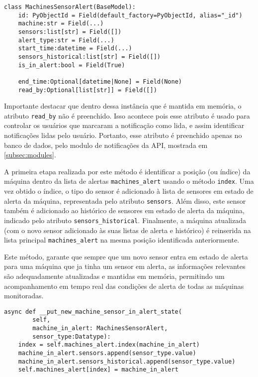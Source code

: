 \begin{verbatim}
class MachinesSensorAlert(BaseModel):
    id: PyObjectId = Field(default_factory=PyObjectId, alias="_id")
    machine:str = Field(...)
    sensors:list[str] = Field([])
    alert_type:str = Field(...)
    start_time:datetime = Field(...)
    sensors_historical:list[str] = Field([])
    is_in_alert:bool = Field(True)
    
    end_time:Optional[datetime|None] = Field(None)
    read_by:Optional[list[str]] = Field([])
\end{verbatim}

Importante destacar que dentro dessa instância que é mantida em memória, o atributo \texttt{read\_by} não é preenchido. Isso acontece pois esse atributo é usado para controlar os usuários que marcaram a notificação como lida, e assim identificar notificações lidas pelo usuário. Portanto, esse atributo é preenchido apenas no banco de dados, pelo modulo de notificações da \gls{API}, mostrada em \ref{subsec:modules}.

A primeira etapa realizada por este método é identificar a posição (ou índice) da máquina dentro da lista de alertas \texttt{machines\_alert} usando o método \texttt{index}. Uma vez obtido o índice, o tipo do sensor é adicionado à lista de sensores em estado de alerta da máquina, representada pelo atributo \texttt{sensors}. Além disso, este sensor também é adicionado ao histórico de sensores em estado de alerta da máquina, indicado pelo atributo \texttt{sensors\_historical}. Finalmente, a máquina atualizada (com o novo sensor adicionado às suas listas de alerta e histórico) é reinserida na lista principal \texttt{machines\_alert} na mesma posição identificada anteriormente.

Este método, garante que sempre que um novo sensor entra em estado de alerta para uma máquina que ja tinha um sensor em alerta, as informações relevantes são adequadamente atualizadas e mantidas em memória, permitindo um acompanhamento em tempo real das condições de alerta de todas as máquinas monitoradas.

\begin{verbatim}
async def __put_new_machine_sensor_in_alert_state(
        self,
        machine_in_alert: MachinesSensorAlert,
        sensor_type:Datatype):
    index = self.machines_alert.index(machine_in_alert)
    machine_in_alert.sensors.append(sensor_type.value)
    machine_in_alert.sensors_historical.append(sensor_type.value)
    self.machines_alert[index] = machine_in_alert
\end{verbatim}

